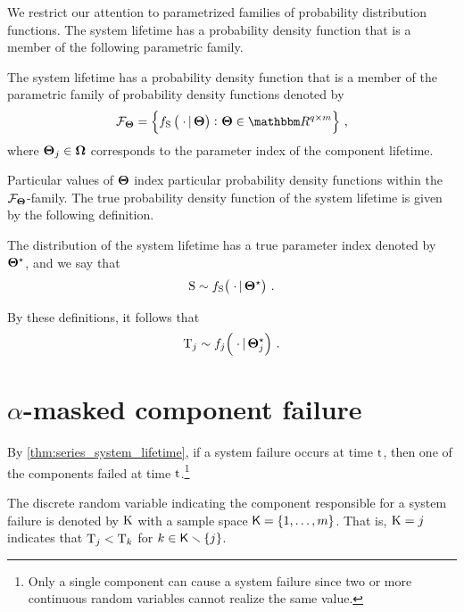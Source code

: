 \documentclass[
    11pt,
    extrafontsizes,
    article,
    oldfontcommands,
    final,
    oneside,
    openany,
    hidelinks]{memoir}
\begin{document}
We restrict our attention to parametrized families of probability distribution functions. The system lifetime has a probability density function that is a member of the following parametric family.
\begin{definition}
    \label{def:sysparametric}
    The system lifetime has a probability density function that is a member of 
    the parametric family of probability density functions denoted by
    \begin{equation}
    \label{eq:paramsys}
    \pfam = \left \{ \spdf\left(\; \cdot \given \sysparam\right) \colon 
    \sysparam \in \RealSet^{q \times m} \right \}\,,
    \end{equation}
    where $\boldsymbol{\Theta}_j \in \boldsymbol\Omega$ corresponds to the parameter 
    index of the \jth component lifetime.
\end{definition}
Particular values of $\boldsymbol{\Theta}$ index particular probability density functions 
within the $\mathcal{F}_{\boldsymbol{\Theta}}$-family. The true probability density function of the system 
lifetime is given by the following definition.
\begin{definition}
    \label{def:true_param}
    The distribution of the system lifetime has a true parameter index denoted 
    by ${\boldsymbol{\Theta}}^{\star}$, and we say that
    \begin{equation}
        \mathrm{S} \sim f_{\mathrm{S}}\!\left(\;\cdot {\,|\,} {\boldsymbol{\Theta}}^{\star}\right)\,.
    \end{equation}
\end{definition}
By these definitions, it follows that
\begin{equation}
    \mathrm{T}_j \sim f_j\!\left(\; \cdot {\,|\,} {\boldsymbol{\Theta}}^{\star}_j\right)\,.
\end{equation}

\section{$\alpha$-masked component failure}
By \cref{thm:series_system_lifetime}, if a system failure occurs at time $\rm{t}$, then one of the components failed at time $\rm{t}$.\footnote{Only a single component can cause a system failure since two or more continuous random variables cannot realize the same value.}
\begin{definition}
\label{def:comp_cause}
The discrete random variable indicating the component responsible for a system failure is denoted by $\mathrm{K}$ with a sample space $\Set{K} = \{1,\ldots,m\}$. That is, $\mathrm{K} = j$ indicates that $\mathrm{T}_j < \mathrm{T}_k$ for $k \in \SetDiff[\Set{K}][\{ j \}]$.
\end{definition}
\end{document}
